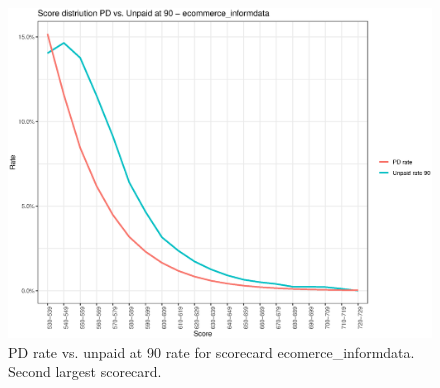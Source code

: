 \begin{figure}[!ht]
  \centering
  \includegraphics[width=5in,trim={0 0 0 0},clip]{content/figures/scdist_dev_ecommerce_informdata.eps} 
  \caption{PD rate vs. unpaid at 90 rate for scorecard ecomerce\_informdata. Second largest scorecard.}
  \label{fig:scdist_dev_ecommerce_informdata}
\end{figure}































